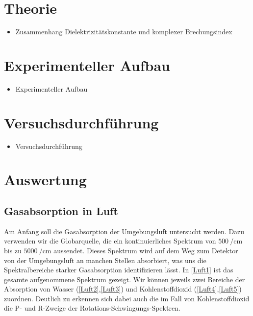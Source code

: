 \documentclass[paper=a4,fontsize=10pt,DIV=18,twocolumn,parskip=half]{scrartcl}
\numberwithin{equation}{section}    %
\begin{document}

\section{Theorie}
\begin{itemize}
\item Zusammenhang Dielektrizitätskonstante und komplexer Brechungsindex
\end{itemize}


\section{Experimenteller Aufbau}
\begin{itemize}
\item Experimenteller Aufbau
\end{itemize}


\section{Versuchsdurchführung}
\begin{itemize}
\item Versuchsdurchführung
\end{itemize}


\section{Auswertung}

\subsection{Gasabsorption in Luft}
Am Anfang soll die Gasabsorption der Umgebungsluft untersucht werden. 
Dazu verwenden wir die Globarquelle, die ein kontinuierliches Spektrum von $\SI{500}{\per\centi\meter}$ bis zu $\SI{5000}{\per\centi\meter}$ aussendet. 
Dieses Spektrum wird auf dem Weg zum Detektor von der Umgebungsluft an manchen Stellen absorbiert, was uns die Spektralbereiche starker Gasabsorption identifizieren lässt.
In \ref{Luft1} ist das gesamte aufgenommene Spektrum gezeigt. 
Wir können jeweils zwei Bereiche der Absorption von Wasser (\ref{Luft2},\ref{Luft3}) und Kohlenstoffdioxid (\ref{Luft4},\ref{Luft5}) zuordnen. 
Deutlich zu erkennen sich dabei auch die im Fall von Kohlenstoffdioxid die P- und R-Zweige der Rotations-Schwingungs-Spektren.
\end{document}
